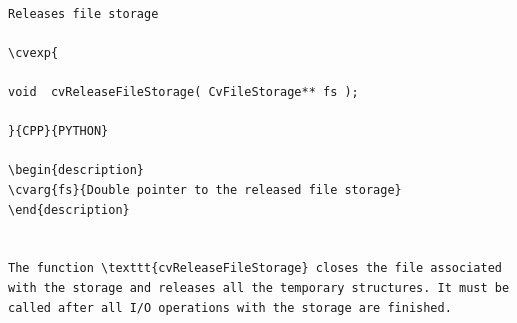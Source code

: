 \label{ReleaseFileStorage}
\begin{verbatim}

Releases file storage

\cvexp{

void  cvReleaseFileStorage( CvFileStorage** fs );

}{CPP}{PYTHON}

\begin{description}
\cvarg{fs}{Double pointer to the released file storage}
\end{description}


The function \texttt{cvReleaseFileStorage} closes the file associated with the storage and releases all the temporary structures. It must be called after all I/O operations with the storage are finished.


\end{verbatim}
